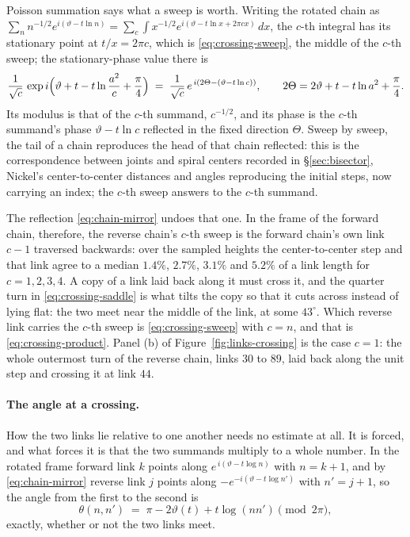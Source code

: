 \documentclass[11pt]{article}
\theoremstyle{definition}
\begin{document}
Poisson summation says what a sweep is worth. Writing the rotated chain as
$\sum_{n}n^{-1/2}e^{i(\vartheta-t\ln n)}
=\sum_{c}\int x^{-1/2}e^{i(\vartheta-t\ln x+2\pi cx)}\,dx$, the $c$-th integral
has its stationary point at $t/x=2\pi c$, which is \eqref{eq:crossing-sweep},
the middle of the $c$-th sweep; the stationary-phase value there is
\begin{equation}\label{eq:crossing-saddle}
\frac{1}{\sqrt c}\,
\exp i\Bigl(\vartheta+t-t\ln\frac{a^{2}}{c}+\frac\pi4\Bigr)
\;=\;\frac{1}{\sqrt c}\,e^{\,i\left(2\Theta-(\vartheta-t\ln c)\right)},
\qquad
2\Theta=2\vartheta+t-t\ln a^{2}+\frac\pi4 .
\end{equation}
Its modulus is that of the $c$-th summand, $c^{-1/2}$, and its phase is the
$c$-th summand's phase $\vartheta-t\ln c$ reflected in the fixed direction
$\Theta$. Sweep by sweep, the tail of a chain reproduces the head of that chain
reflected: this is the correspondence between joints and spiral centers
recorded in \S\ref{sec:bisector}, Nickel's center-to-center distances and
angles reproducing the initial steps, now carrying an index; the $c$-th sweep
answers to the $c$-th summand.

The reflection \eqref{eq:chain-mirror} undoes that
one. In the frame of the forward chain, therefore, the reverse chain's $c$-th
sweep is the forward chain's own link $c-1$ traversed backwards: over the
sampled heights the center-to-center step and that link agree to a median
$1.4\%$, $2.7\%$, $3.1\%$ and $5.2\%$ of a link length for $c=1,2,3,4$. A copy
of a link laid back along it must cross it, and the quarter turn in
\eqref{eq:crossing-saddle} is what tilts the copy so that it cuts across
instead of lying flat: the two meet near the middle of the link, at some
$43^{\circ}$. Which reverse link carries the $c$-th sweep is
\eqref{eq:crossing-sweep} with $c=n$, and that is
\eqref{eq:crossing-product}. Panel (b) of Figure~\ref{fig:links-crossing} is
the case $c=1$: the whole outermost turn of the reverse chain, links $30$ to
$89$, laid back along the unit step and crossing it at link $44$.

\paragraph{The angle at a crossing.} How the two links lie relative to one
another needs no estimate at all. It is forced, and what forces it is that the
two summands multiply to a whole number.
In the rotated frame forward link $k$ points
along $e^{\,i(\vartheta-t\log n)}$ with $n=k+1$, and by \eqref{eq:chain-mirror}
reverse link $j$ points along $-e^{-i(\vartheta-t\log n')}$ with $n'=j+1$, so
the angle from the first to the second is
\begin{equation}\label{eq:crossing-angle}
\theta(n,n')\;=\;\pi-2\vartheta(t)+t\log(n n')\pmod{2\pi},
\end{equation}
exactly, whether or not the two links meet.
\end{document}
